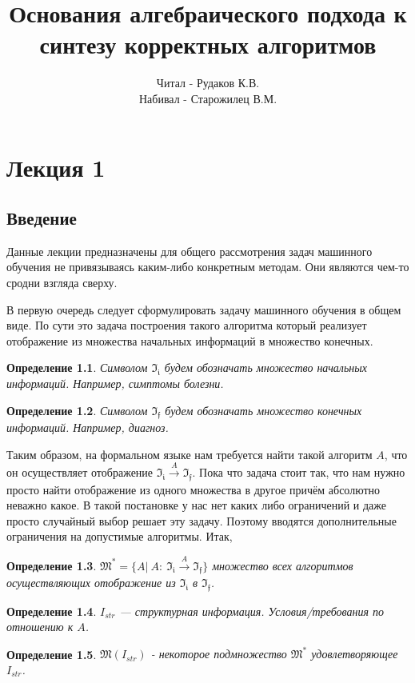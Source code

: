 \documentclass[a4paper, 12pt]{report}
\newtheorem*{definition}{Определение}
\begin{document}
\title{Основания алгебраического подхода к синтезу корректных алгоритмов}
\author{Читал - Рудаков К.В.\\ Набивал - Старожилец В.М.}
\date{}
\maketitle

\tableofcontents

\chapter{Лекция 1}
\section{Введение}
Данные лекции предназначены для общего рассмотрения задач машинного обучения не привязываясь каким-либо конкретным методам. Они являются чем-то сродни взгляда сверху.

В первую очередь следует сформулировать задачу машинного обучения в общем виде. По сути это задача построения такого алгоритма который реализует отображение из множества начальных информаций в множество конечных.

\begin{definition} Символом $\mathfrak{I_i}$ будем обозначать множество начальных информаций. Например, симптомы болезни. \end{definition}
\begin{definition} Символом $\mathfrak{I_f}$ будем обозначать множество конечных информаций. Например, диагноз. \end{definition}

Таким образом, на формальном языке нам требуется найти такой алгоритм $A$, что он осуществляет отображение $\mathfrak{I_i}\xrightarrow{A}\mathfrak{I_f}$. Пока что задача стоит так, что нам нужно просто найти отображение из одного множества в другое причём абсолютно неважно какое. В такой постановке у нас нет каких либо ограничений и даже просто случайный выбор решает эту задачу. Поэтому вводятся дополнительные ограничения на допустимые алгоритмы. Итак,

\begin{definition} $\mathfrak{M}^* = \{A|\ A:\  \mathfrak{I_i}\xrightarrow{A}\mathfrak{I_f}\}$ множество всех алгоритмов осуществляющих отображение из $\mathfrak{I_i}$ в $\mathfrak{I_f}$. \end{definition}
\begin{definition} $I_{str}$ --- структурная информация. Условия/требования по отношению к $A$. \end{definition}
\begin{definition} $\mathfrak{M}(I_{str})$ - некоторое подмножество $\mathfrak{M}^*$ удовлетворяющее $I_{str}$. \end{definition}
\end{document}
